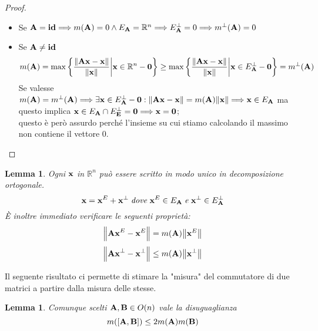 \documentclass[a4paper,11pt,openright,twoside	]{book}
\newtheorem{lemma}[theorem]{Lemma}
\begin{document}
\begin{proof}
\begin{itemize}
\item Se $\vb{A = id} \Longrightarrow m(\vb{A}) = 0 \land E_{\vb{A}} = \mathbb{R}^n \Longrightarrow E^{\perp}_{\vb{A}} = {0} \Longrightarrow m^{\perp}(\vb{A}) = 0$
\item Se $\vb{A \neq id}$ 
\[ m(\vb{A}) = \max \bigg\{ \frac{\norm{\vb{Ax-x}}}{\norm{\vb{x}}} \bigg|  \vb{x} \in \mathbb{R}^{n}-\vb{0} \bigg\} 
\geq \max \bigg\{ \frac{\norm{\vb{Ax-x}}}{\norm{\vb{x}}} \bigg|  \vb{x} \in E^{\perp}_{\vb{A}} - \vb{0} \bigg\} =  m^{\perp}(\vb{A}) \]
Se valesse $m(\vb{A}) = m^{\perp}(\vb{A}) \Longrightarrow \exists \vb{x} \in E^{\perp}_{\vb{A}} - \vb{0} : \norm{\vb{Ax-x}} = m(\vb{A})\norm{\vb{x}} \Longrightarrow \vb{x} \in E_{\vb{A}}$  ma questo implica $\vb{x} \in E_{\vb{A}} \cap E^{\perp}_{\vb{E}} = {\vb{0}} \Longrightarrow \vb{x = 0} $;  \\
questo è però assurdo perché l'insieme su cui stiamo calcolando il massimo non contiene il vettore $0$.
\end{itemize}
\end{proof}
\begin{lemma}
Ogni $\vb{x}$ in $\mathbb{R}^n $ può essere scritto in modo unico in decomposizione ortogonale. 
\[ \vb{x} = \vb{x}^E + \vb{x}^{\perp} \; \mathit{dove} \; \vb{x}^E \in E_{\vb{A}} \; \mathit{e} \; \vb{x}^{\perp} \in E^{\perp}_{\vb{A}} \]
\`E inoltre immediato verificare le seguenti proprietà:
\[ \norm{\vb{Ax}^E - \vb{x}^E }= m(\vb{A})\norm{\vb{x}^E} \] \[\norm{\vb{Ax}^{\perp} - \vb{x}^{\perp}} \leq m(\vb{A}) \norm{\vb{x}^{\perp}} \]
\end{lemma}
Il seguente risultato ci permette di stimare la "misura" del commutatore di due matrici a partire dalla misura delle stesse. 
\begin{lemma}
\label{lemma:2}
 Comunque scelti $\vb{ A, B} \in O(n)$ vale la disuguaglianza 
 \[ m([\vb{A,B}]) \leq 2m(\vb{A})m(\vb{B}) \]
\end{lemma}
\end{document}
